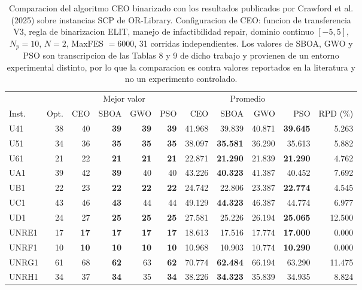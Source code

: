 \begin{table}[htbp]
\centering
\footnotesize
\caption{Comparacion del algoritmo CEO binarizado con los resultados publicados por Crawford et al. (2025) sobre instancias SCP de OR-Library. Configuracion de CEO: funcion de transferencia V3, regla de binarizacion ELIT, manejo de infactibilidad repair, dominio continuo $[-5,5]$, $N_p=10$, $N=2$, MaxFES $=6000$, 31 corridas independientes. Los valores de SBOA, GWO y PSO son transcripcion de las Tablas 8 y 9 de dicho trabajo y provienen de un entorno experimental distinto, por lo que la comparacion es contra valores reportados en la literatura y no un experimento controlado.}
\label{tab:ceo-scp}
\begin{tabular}{lrrrrrrrrrr}
\toprule
 & & \multicolumn{4}{c}{Mejor valor} & \multicolumn{4}{c}{Promedio} & \\
\cmidrule(lr){3-6} \cmidrule(lr){7-10}
Inst. & Opt. & CEO & SBOA & GWO & PSO & CEO & SBOA & GWO & PSO & RPD (\%) \\
\midrule
U41 & 38 & 40 & \textbf{39} & \textbf{39} & \textbf{39} & 41.968 & 39.839 & 40.871 & \textbf{39.645} & 5.263 \\
U51 & 34 & 36 & \textbf{35} & \textbf{35} & \textbf{35} & 38.097 & \textbf{35.581} & 36.290 & 35.613 & 5.882 \\
U61 & 21 & 22 & \textbf{21} & \textbf{21} & \textbf{21} & 22.871 & \textbf{21.290} & 21.839 & \textbf{21.290} & 4.762 \\
UA1 & 39 & 42 & \textbf{39} & 40 & 40 & 43.226 & \textbf{40.323} & 41.387 & 40.452 & 7.692 \\
UB1 & 22 & 23 & \textbf{22} & \textbf{22} & \textbf{22} & 24.742 & 22.806 & 23.387 & \textbf{22.774} & 4.545 \\
UC1 & 43 & 46 & \textbf{43} & 44 & 44 & 49.129 & \textbf{44.323} & 46.387 & 44.774 & 6.977 \\
UD1 & 24 & 27 & \textbf{25} & \textbf{25} & \textbf{25} & 27.581 & 25.226 & 26.194 & \textbf{25.065} & 12.500 \\
UNRE1 & 17 & \textbf{17} & \textbf{17} & \textbf{17} & \textbf{17} & 18.613 & 17.516 & 17.774 & \textbf{17.000} & 0.000 \\
UNRF1 & 10 & \textbf{10} & \textbf{10} & \textbf{10} & \textbf{10} & 10.968 & 10.903 & 10.774 & \textbf{10.290} & 0.000 \\
UNRG1 & 61 & 68 & \textbf{62} & 63 & \textbf{62} & 70.774 & \textbf{62.484} & 66.194 & 63.290 & 11.475 \\
UNRH1 & 34 & 37 & \textbf{34} & 35 & \textbf{34} & 38.226 & \textbf{34.323} & 35.839 & 34.935 & 8.824 \\

\end{tabular}
\end{table}
